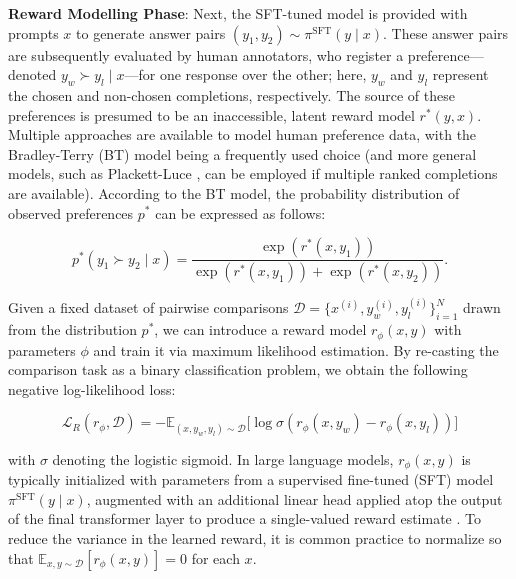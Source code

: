 \textbf{Reward Modelling Phase}: Next, the SFT-tuned model is provided with prompts $x$ to generate answer pairs $(y_1, y_2)\sim \pi^\text{SFT}(y \mid x)$. These answer pairs are subsequently evaluated by human annotators, who register a preference—denoted $y_w\succ y_l \mid x$—for one response over the other; here, $y_w$ and $y_l$ represent the chosen and non-chosen completions, respectively. The source of these preferences is presumed to be an inaccessible, latent reward model $r^*(y, x)$. Multiple approaches are available to model human preference data, with the Bradley-Terry (BT) \cite{bradley1952rankanalysis} model being a frequently used choice (and more general models, such as Plackett-Luce \citep{plackett1975analysis, luce2012individual}, can be employed if multiple ranked completions are available). According to the BT model, the probability distribution of observed preferences $p^*$ can be expressed as follows:

\begin{equation}\label{eq:bradley-terry}
    p^*(y_1\succ y_2 \mid x)=\frac{\exp\left(r^*(x, y_1)\right)}{\exp\left(r^*(x, y_1)\right) + \exp\left(r^*(x, y_2)\right)}.
\end{equation}

Given a fixed dataset of pairwise comparisons $\mathcal{D}=\bigl\{x^{(i)}, y_w^{(i)}, y_l^{(i)}\bigr\}_{i=1}^N$ drawn from the distribution $p^*$, we can introduce a reward model $r_{\phi}(x, y)$ with parameters $\phi$ and train it via maximum likelihood estimation. By re-casting the comparison task as a binary classification problem, we obtain the following negative log-likelihood loss:

\begin{equation}\label{eq:reward_model}
    \mathcal{L}_R(r_{\phi}, \mathcal{D}) = -\mathbb{E}_{(x, y_w, y_l)\sim \mathcal{D}}\bigl[\log \sigma(r_{\phi}(x, y_w)- r_{\phi}(x, y_l))\bigr]
\end{equation}

with $\sigma$ denoting the logistic sigmoid. In large language models, $r_{\phi}(x, y)$ is typically initialized with parameters from a supervised fine-tuned (SFT) model $\pi^\text{SFT}(y \mid x)$, augmented with an additional linear head applied atop the output of the final transformer layer to produce a single-valued reward estimate \cite{ziegler2020finetuning}. To reduce the variance in the learned reward, it is common practice to normalize so that $\mathbb{E}_{x,y\sim \mathcal{D}}\left[r_\phi(x, y)\right] = 0$ for each $x$.

